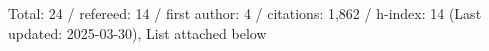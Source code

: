 Total: 24 / refereed: 14 / first author: 4 / citations: 1,862 / h-index: 14 (Last updated: 2025-03-30), List attached below